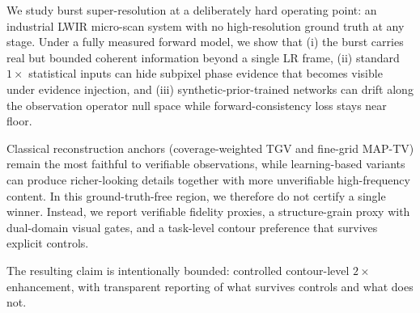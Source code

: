 We study burst super-resolution at a deliberately hard operating point: an
industrial LWIR micro-scan system with no high-resolution ground truth at any
stage. Under a fully measured forward model, we show that (i) the burst carries
real but bounded coherent information beyond a single LR frame, (ii) standard
$1\times$ statistical inputs can hide subpixel phase evidence that becomes
visible under evidence injection, and (iii) synthetic-prior-trained networks can
drift along the observation operator null space while forward-consistency loss
stays near floor.

Classical reconstruction anchors (coverage-weighted TGV and fine-grid MAP-TV)
remain the most faithful to verifiable observations, while learning-based
variants can produce richer-looking details together with more unverifiable
high-frequency content. In this ground-truth-free region, we therefore do not
certify a single winner. Instead, we report verifiable fidelity proxies, a
structure-grain proxy with dual-domain visual gates, and a task-level contour
preference that survives explicit controls.

The resulting claim is intentionally bounded: controlled contour-level
$2\times$ enhancement, with transparent reporting of what survives controls and
what does not.

